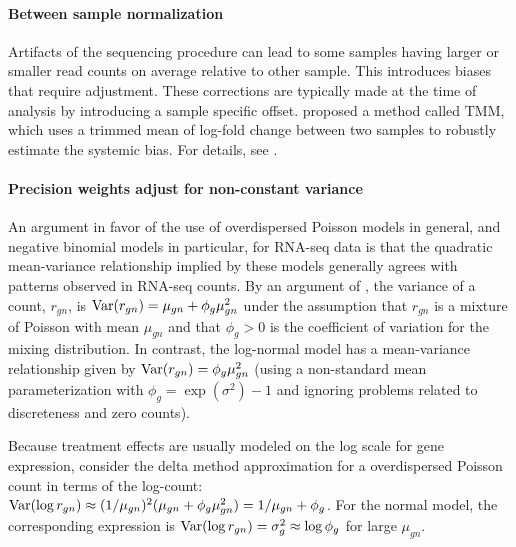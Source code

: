 \paragraph{Between sample normalization}
Artifacts of the sequencing procedure can lead to some samples having larger or smaller read counts on average relative to other sample. This introduces biases that require adjustment. These corrections are typically made at the time of analysis by introducing a sample specific offset. \citet{robinson2010} proposed a method called TMM, which uses a trimmed mean of log-fold change between two samples to robustly estimate the systemic bias. For details, see \citet{robinson2010}.

\paragraph{Precision weights adjust for non-constant variance}
An argument in favor of the use of overdispersed Poisson models in general, and negative binomial models in particular, for RNA-seq data is that the quadratic mean-variance relationship implied by these models generally agrees with patterns observed in RNA-seq counts.  By an argument of \citet[p.4290]{mccarthy}, the variance of a count, $r_{gn}$, is $\operatorname{Var}(r_{gn})=\mu_{gn} + \phi_g \mu_{gn}^2$ under the assumption that $r_{gn}$ is a mixture of Poisson with mean $\mu_{gn}$ and that $\phi_g>0$ is the coefficient of variation for the mixing distribution. In contrast, the log-normal model has a mean-variance relationship given by $\operatorname{Var}(r_{gn})=\phi_g \mu_{gn}^2$ (using a non-standard mean parameterization with $\phi_g=\exp(\sigma^2)-1$ and ignoring problems related to discreteness and zero counts).


Because treatment effects are usually modeled on the log scale for gene expression, consider the delta method  approximation for a overdispersed Poisson count in terms of the log-count: $\operatorname{Var}(\log r_{gn}) \approx (1/\mu_{gn})^2(\mu_{gn} + \phi_g\mu_{gn}^2)=1/\mu_{gn} + \phi_g$. For the normal model, the corresponding expression is $\operatorname{Var}(\log r_{gn}) = \sigma^2_g\approx \log \phi_g$ for large $\mu_{gn}$.

